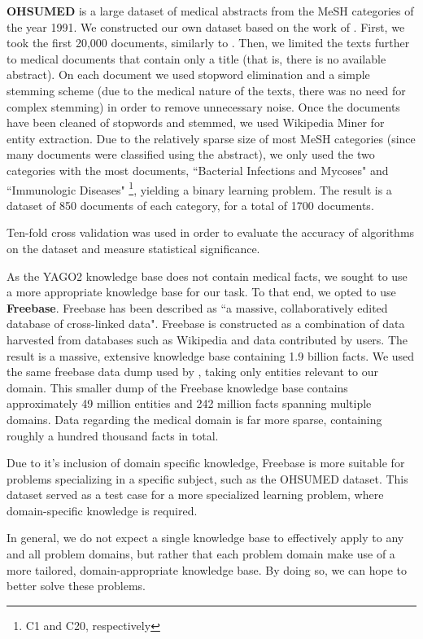 \documentclass[twoside,11pt]{article}
\theoremstyle{definition}
\begin{document}
\textbf{OHSUMED} is a large dataset of medical abstracts from the MeSH categories of the year 1991. 
We constructed our own dataset based on the work of .
First, we took the first 20,000 documents, similarly to .
Then, we limited the texts further to medical documents that contain only a title (that is, there is no available abstract). On each document we used stopword elimination and a simple stemming scheme (due to the medical nature of the texts, there was no need for complex stemming) in order to remove unnecessary noise. Once the documents have been cleaned of stopwords and stemmed, we used Wikipedia Miner \cite{milne2013open} for entity extraction. 
Due to the relatively sparse size of most MeSH categories (since many documents were classified using the abstract), we only used the two categories with the most documents, ``Bacterial Infections and Mycoses" and ``Immunologic Diseases" \footnote{C1 and C20, respectively}, yielding a binary learning problem.
The result is a dataset of 850 documents of each category, for a total of 1700 documents.

Ten-fold cross validation was used in order to evaluate the accuracy of algorithms on the dataset and measure statistical significance.

As the YAGO2 knowledge base does not contain medical facts, we sought to use a more appropriate knowledge base for our task. To that end, we opted to use \textbf{Freebase}.
Freebase has been described as ``a massive, collaboratively edited database of cross-linked data". Freebase is constructed as a combination of data harvested from databases such as Wikipedia and data contributed by users. The result is a massive, extensive knowledge base containing 1.9 billion facts. 
We used the same freebase data dump used by , taking only entities relevant to our domain. This smaller dump of the Freebase knowledge base contains approximately 49 million entities and 242 million facts spanning multiple domains. Data regarding the medical domain is far more sparse, containing roughly a hundred thousand facts in total.

Due to it's inclusion of domain specific knowledge, Freebase is more suitable for problems specializing in a specific subject, such as the OHSUMED dataset. 
This dataset served as a test case for a more specialized learning problem, where domain-specific knowledge is required.

In general, we do not expect a single knowledge base to effectively apply to any and all problem domains, but rather that each problem domain make use of a more tailored, domain-appropriate knowledge base. By doing so, we can hope to better solve these problems.
\end{document}
